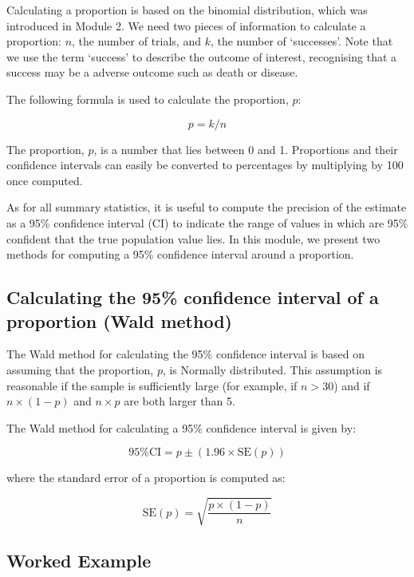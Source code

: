 \documentclass[
]{memoir}
\begin{document}
Calculating a proportion is based on the binomial distribution, which was introduced in Module 2. We need two pieces of information to calculate a proportion: \(n\), the number of trials, and \(k\), the number of `successes'. Note that we use the term `success' to describe the outcome of interest, recognising that a success may be a adverse outcome such as death or disease.

The following formula is used to calculate the proportion, \(p\):

\[ p = k / n \]

The proportion, \(p\), is a number that lies between 0 and 1. Proportions and their confidence intervals can easily be converted to percentages by multiplying by 100 once computed.

As for all summary statistics, it is useful to compute the precision of the estimate as a 95\% confidence interval (CI) to indicate the range of values in which are 95\% confident that the true population value lies. In this module, we present two methods for computing a 95\% confidence interval around a proportion.

\hypertarget{calculating-the-95-confidence-interval-of-a-proportion-wald-method}{%
\subsection{Calculating the 95\% confidence interval of a proportion (Wald method)}\label{calculating-the-95-confidence-interval-of-a-proportion-wald-method}}

The Wald method for calculating the 95\% confidence interval is based on assuming that the proportion, \(p\), is Normally distributed. This assumption is reasonable if the sample is sufficiently large (for example, if \(n>30\)) and if \(n \times (1-p)\) and \(n \times p\) are both larger than 5.

The Wald method for calculating a 95\% confidence interval is given by:

\[\text{95\% CI} = p \pm (1.96 \times \text{SE}(p))\]

where the standard error of a proportion is computed as:

\[\text{SE}(p) = \sqrt{\frac{p \times (1 - p)}{n}}\]

\hypertarget{worked-example-6}{%
\subsection{Worked Example}\label{worked-example-6}}
\end{document}
